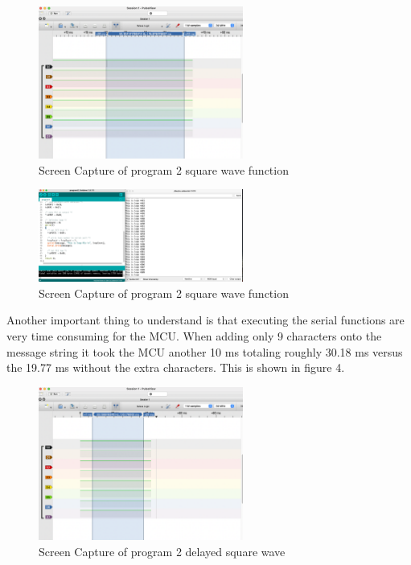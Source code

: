 \documentclass[11pt,pdftex,portrait,letterpaper]{article}
\begin{document}
\begin{figure}[h]
	\centering
	\includegraphics[width=0.6\textwidth]{./PG2_logicAnalyzer_1}	%
	\caption{Screen Capture of program 2 square wave function}
	\label{f:fig1}	%
\end{figure}
\begin{figure}[h]
	\centering
	\includegraphics[width=0.6\textwidth]{./PG2_serialMonitor}	%
	\caption{Screen Capture of program 2 square wave function}
	\label{f:fig1}	%
\end{figure}

Another important thing to understand is that executing the serial functions are very time consuming for the MCU. When adding only 9 characters onto the message string it took the MCU another 10 ms totaling roughly 30.18 ms versus the 19.77 ms without the extra characters. This is shown in figure 4.
\begin{figure}[h]
	\centering
	\includegraphics[width=0.6\textwidth]{./PG2_logicAnalyzer_2}	%
	\caption{Screen Capture of program 2 delayed square wave}
	\label{f:fig1}	%
\end{figure}
\end{document}
